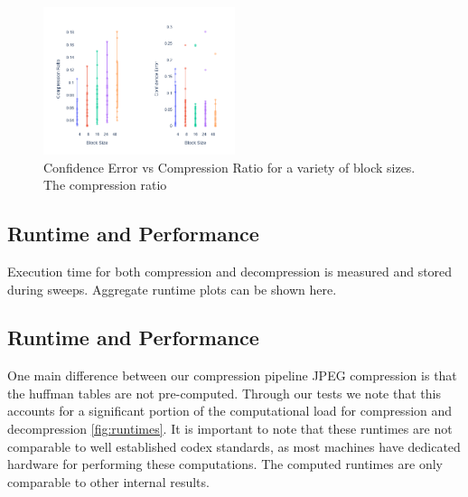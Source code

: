\begin{figure}
    \includegraphics[width=0.5\textwidth]{assets/Confidence Err Vs Block Size.png}
    \caption{Confidence Error vs Compression Ratio for a variety of block sizes. The compression ratio }
    \label{fig:block_size_sweep}
\end{figure}
\subsection{Runtime and Performance}
Execution time for both compression and decompression is measured and stored during sweeps. Aggregate runtime plots can be shown here.

\subsection{Runtime and Performance}

One main difference between our compression pipeline JPEG compression is that the huffman tables are not pre-computed. Through our tests we note that this accounts for a significant portion of the computational load for compression and decompression \ref{fig:runtimes}. It is important to note that these runtimes are not comparable to well established codex standards, as most machines have dedicated hardware for performing these computations. The computed runtimes are only comparable to other internal results. 

